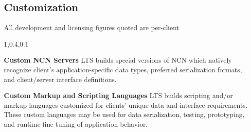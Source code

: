 
\begin{frame}{}
\section{Customization}

\vspace{-.4em}	

\hspace{27pt}\raisebox{4pt}{\MySquare{}}\hspace{2pt}
{\selectfont\LARGE All development and licensing figures 
	quoted are per-client}

\vspace{1em}

{\Large{}\selectfont
\hspace*{20pt}\begin{minipage}{.98\textwidth}
\vspace{-8pt}


		
\begin{lightquadblockc}{1,0.4,0.1}{\parbox{24cm}{}\vspace{8pt}}
\hspace{-4pt}\begin{minipage}{1.07\textwidth}
{\LARGE \setlength{\leftmargini}{30pt}\begin{enumerate}
\dmitem \textbf{Custom NCN Servers} \hspace{.5em} 
LTS builds special versions of 
NCN which natively recognize client's application-specific 
data types, preferred serialization formats, 
and client/server interface definitions.\\ 
{\color[rgb]{0.3,0,0.1}{(dev: \$75K; licensing: \$10K/month)}}\vspace{16pt}


\dmitem \textbf{Custom Markup and Scripting Languages}  \hspace{.5em} 
LTS builds scripting and/or markup languages 
customized for clients' unique data and interface 
requirements.  These custom languages may be used 
for data serialization, testing, prototyping, 
and runtime fine-tuning of application behavior.\\
{\color[rgb]{0.3,0,0.1}{(dev: \$250K; licensing: \$10K/month)}}\vspace{16pt}


\end{enumerate}}
\end{minipage}
\end{lightquadblockc}
\end{minipage}}
\end{frame}
